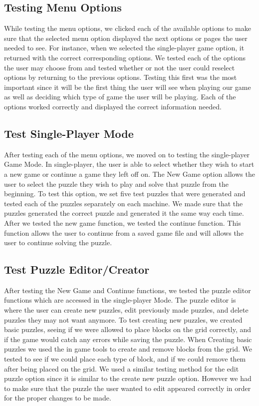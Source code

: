 \documentclass[12pt]{article}
\begin{document}
\subsection{Testing Menu Options}
While testing the menu options, we clicked each of the available options to make sure that the selected menu option displayed the next options or pages the user needed to see. 
For instance, when we selected the single-player game option, it returned with the correct corresponding options. 
We tested each of the options the user may choose from and tested whether or not the user could reselect options by returning to the previous options. Testing this first was the most important since it will be the first thing the user will see when playing our game as well as deciding which type of game the user will be playing. 
Each of the options worked correctly and displayed the correct information needed.

\subsection{Test Single-Player Mode}
After testing each of the menu options, we moved on to testing the single-player Game Mode.
In single-player, the user is able to select whether they wish to start a new game or continue a game they left off on. The New Game option allows the user to select the puzzle they wish to play and solve that puzzle from the beginning.
To test this option, we set five test puzzles that were generated and tested each of the puzzles separately on each machine. We made sure that the puzzles generated the correct puzzle and generated it the same way each time.
After we tested the new game function, we tested the continue function. This function allows the user to continue from a saved game file and will allows the user to continue solving the puzzle.

\subsection{Test Puzzle Editor/Creator}
After testing the New Game and Continue functions, we tested the puzzle editor functions which are accessed in the single-player Mode. The puzzle editor is where the user can create new puzzles, edit previously made puzzles, and delete puzzles they may not want anymore. To test creating new puzzles, we created basic puzzles, seeing if we were allowed to place blocks on the grid correctly, and if the game would catch any errors while saving the puzzle. When Creating basic puzzles we used the in game tools to create and remove blocks from the grid. We tested to see if we could place each type of block, and if we could remove them after being placed on the grid.
We used a similar testing method for the edit puzzle option since it is similar to the create new puzzle option. However we had to make sure that the puzzle the user wanted to edit appeared correctly in order for the proper changes to be made.
\end{document}
